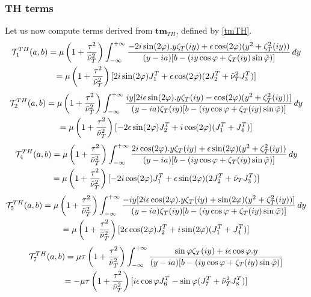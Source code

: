 \subsubsection{TH terms}
Let us now compute terms derived from $\mathbf{tm}_{TH}$, defined by \eqref{tmTH}.
\begin{multline}
\mathcal{T}_1^{TH}(a,b)=\mu\left(1+\frac{\tau^2}{\nuti_T^2}\right)\int_{-\infty}^{+\infty} \frac{-2i\sin(2\varphi).y\zeta_T(iy)+\epsilon \cos (2\varphi)(y^2+\zeta_T^2(iy))}{(y-ia)\lbrack b-(iy\cos \varphi+ \zeta_T(iy)\sin\phiti) \rbrack} \, dy \\
\hfill=\mu\left(1+\frac{\tau^2}{\nuti_T^2}\right) \lbrack 2i\sin(2\varphi)J_1^T+\epsilon\cos(2\varphi)(2J_2^T+\nuti_T^2 J_3^T)\rbrack \hfill
\end{multline}
\begin{multline}
\mathcal{T}_2^{TH}(a,b)=\mu\left(1+\frac{\tau^2}{\nuti_T^2}\right)\int_{-\infty}^{+\infty} \frac{iy\lbrack 2i\epsilon \sin(2\varphi).y\zeta_T(iy)- \cos (2\varphi)(y^2+\zeta_T^2(iy))\rbrack}{(y-ia)\zeta_T(iy)\lbrack b-(iy\cos \varphi+ \zeta_T(iy)\sin\phiti) \rbrack} \, dy \\
\hfill= \mu\left(1+\frac{\tau^2}{\nuti_T^2}\right) \lbrack -2\epsilon\sin(2\varphi)J_2^T+i\cos(2\varphi)(J_1^T+J_4^T) \rbrack \hfill
\end{multline}
\begin{multline}
\mathcal{T}_4^{TH}(a,b)=\mu\left(1+\frac{\tau^2}{\nuti_T^2}\right)\int_{-\infty}^{+\infty} \frac{2i\cos(2\varphi).y\zeta_T(iy)+\epsilon \sin (2\varphi)(y^2+\zeta_T^2(iy))}{(y-ia)\lbrack b-(iy\cos \varphi+ \zeta_T(iy)\sin\phiti) \rbrack} \, dy \\
\hfill =\mu\left(1+\frac{\tau^2}{\nuti_T^2}\right) \lbrack -2i\cos(2\varphi)J_1^T+\epsilon \sin(2\varphi)(2J_2^T+\nuti_TJ_3^T) \rbrack \hfill
\end{multline}
\begin{multline}
\mathcal{T}_5^{TH}(a,b)=\mu\left(1+\frac{\tau^2}{\nuti_T^2}\right)\int_{-\infty}^{+\infty} \frac{-iy\lbrack 2i\epsilon \cos(2\varphi).y\zeta_T(iy)+\sin (2\varphi)(y^2+\zeta_T^2(iy))\rbrack}{(y-ia)\zeta_T(iy)\lbrack b-(iy\cos \varphi+ \zeta_T(iy)\sin\phiti) \rbrack} \, dy \\
\hfill =\mu\left(1+\frac{\tau^2}{\nuti_T^2}\right) \lbrack 2\epsilon\cos(2\varphi)J_2^T+i\sin(2\varphi)(J_1^T+J_4^T)\rbrack \hfill
\end{multline}
\begin{multline}
\mathcal{T}_7^{TH}(a,b)=\mu\tau\left(1+\frac{\tau^2}{\nuti_T^2}\right)\int_{-\infty}^{+\infty} \frac{\sin\varphi\zeta_T(iy)+i\epsilon\cos\varphi.y}{(y-ia)\lbrack b-(iy\cos \varphi+ \zeta_T(iy)\sin\phiti) \rbrack} \\
\hfill = -\mu\tau\left(1+\frac{\tau^2}{\nuti_T^2}\right)\lbrack i\epsilon\cos\varphi J_6^T-\sin\varphi(J_7^T+\nuti_T^2J_8^T)\rbrack \hfill
\end{multline}
